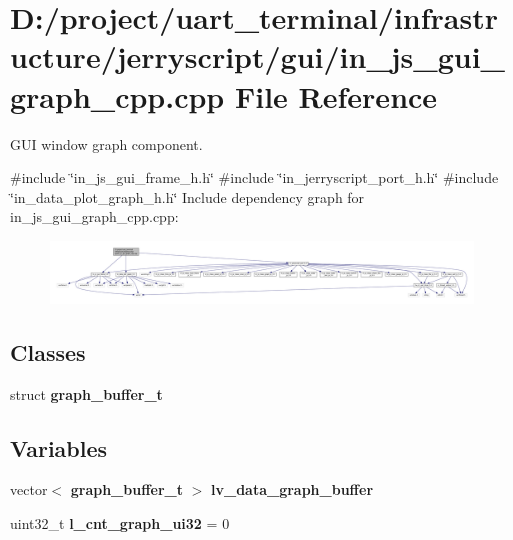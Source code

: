 \section{D\+:/project/uart\+\_\+terminal/infrastructure/jerryscript/gui/in\+\_\+js\+\_\+gui\+\_\+graph\+\_\+cpp.cpp File Reference}
\label{in__js__gui__graph__cpp_8cpp}


G\+UI window graph component.  


{\ttfamily \#include \char`\"{}in\+\_\+js\+\_\+gui\+\_\+frame\+\_\+h.\+h\char`\"{}}\newline
{\ttfamily \#include \char`\"{}in\+\_\+jerryscript\+\_\+port\+\_\+h.\+h\char`\"{}}\newline
{\ttfamily \#include \char`\"{}in\+\_\+data\+\_\+plot\+\_\+graph\+\_\+h.\+h\char`\"{}}\newline
Include dependency graph for in\+\_\+js\+\_\+gui\+\_\+graph\+\_\+cpp.\+cpp\+:
\nopagebreak
\begin{figure}[H]
\begin{center}
\leavevmode
\includegraphics[width=350pt]{in__js__gui__graph__cpp_8cpp__incl}
\end{center}
\end{figure}
\subsection*{Classes}
\begin{DoxyCompactItemize}
\item 
struct \textbf{ graph\+\_\+buffer\+\_\+t}
\end{DoxyCompactItemize}
\subsection*{Variables}
\begin{DoxyCompactItemize}
\item 
vector$<$ \textbf{ graph\+\_\+buffer\+\_\+t} $>$ \textbf{ lv\+\_\+data\+\_\+graph\+\_\+buffer}
\item 
uint32\+\_\+t {\bfseries l\+\_\+cnt\+\_\+graph\+\_\+ui32} = 0
\end{DoxyCompactItemize}


